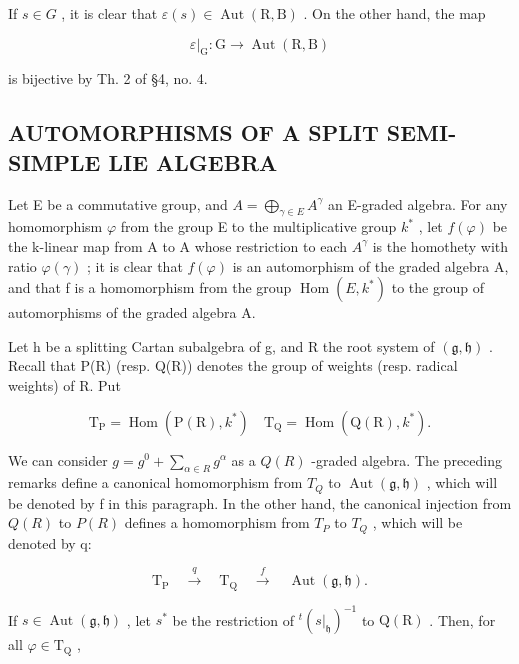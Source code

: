If \(s \in G\) , it is clear that \(\varepsilon(s) \in \operatorname{Aut}(\mathrm{R}, \mathrm{B})\) . On the other hand, the map

\[
\varepsilon|_{\mathrm{G}}: \mathrm{G} \rightarrow \operatorname{Aut} (\mathrm{R}, \mathrm{B})
\]

is bijective by Th. 2 of §4, no. 4.

\subsection{AUTOMORPHISMS OF A SPLIT SEMI-SIMPLE LIE ALGEBRA}

Let E be a commutative group, and \(A = \bigoplus_{\gamma \in E} A^{\gamma}\) an E-graded algebra. For any homomorphism \(\varphi\) from the group E to the multiplicative group \(k^{*}\) , let \(f(\varphi)\) be the k-linear map from A to A whose restriction to each \(A^{\gamma}\) is the homothety with ratio \(\varphi(\gamma)\) ; it is clear that \(f(\varphi)\) is an automorphism of the graded algebra A, and that f is a homomorphism from the group \(\operatorname{Hom}(E, k^{*})\) to the group of automorphisms of the graded algebra A.

Let h be a splitting Cartan subalgebra of g, and R the root system of \((\mathfrak{g}, \mathfrak{h})\) . Recall that P(R) (resp. Q(R)) denotes the group of weights (resp. radical weights) of R. Put

\[
\mathrm{T} _ {\mathrm{P}} = \operatorname{Hom} (\mathrm{P} (\mathrm{R}), k ^ {*}) \quad \mathrm{T} _ {\mathrm{Q}} = \operatorname{Hom} (\mathrm{Q} (\mathrm{R}), k ^ {*}).
\]

We can consider \(g = g^{0} + \sum_{\alpha \in R} g^{\alpha}\) as a \(Q(R)\) -graded algebra. The preceding remarks define a canonical homomorphism from \(T_{Q}\) to \(\operatorname{Aut}(\mathfrak{g}, \mathfrak{h})\) , which will be denoted by f in this paragraph. In the other hand, the canonical injection from \(Q(R)\) to \(P(R)\) defines a homomorphism from \(T_{P}\) to \(T_{Q}\) , which will be denoted by q:

\[
\mathrm{T} _ {\mathrm{P}} \quad \stackrel {{q}} {{\longrightarrow}} \quad \mathrm{T} _ {\mathrm{Q}} \quad \stackrel {{f}} {{\longrightarrow}} \quad \operatorname{Aut} (\mathfrak {g}, \mathfrak {h}).
\]

If \(s \in \operatorname{Aut}(\mathfrak{g}, \mathfrak{h})\) , let \(s^*\) be the restriction of \({}^t(s|_{\mathfrak{h}})^{-1}\) to \(\mathrm{Q}(\mathrm{R})\) . Then, for all \(\varphi \in \mathrm{T}_{\mathrm{Q}}\) ,

